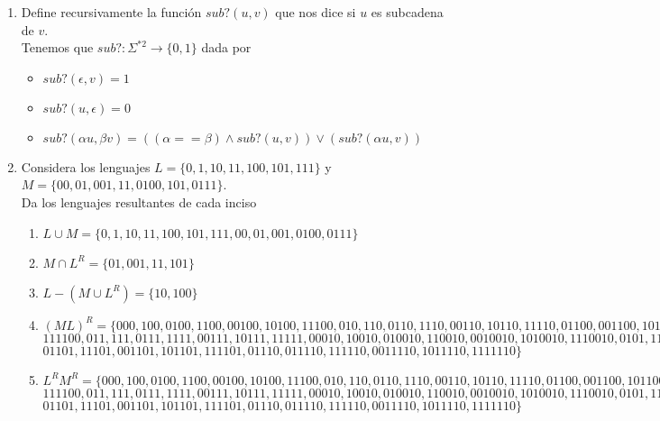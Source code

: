 \documentclass{article}
\begin{document}
\begin{enumerate}
{\begin{enumerate}
            \end{enumerate}
        }
        \item {
            Define recursivamente la función $sub?(u, v)$ que nos dice si $u$ 
            es subcadena de $v$.\\
            Tenemos que $sub?: \Sigma^{*2} \rightarrow \{0, 1\}$ dada por
            \begin{itemize}
                \item {
                    $sub? (\epsilon, v) = 1$
                }
                \item {
                    $sub? (u, \epsilon) = 0$
                }
                \item {
                    $sub?(\alpha u, \beta v) = ((\alpha == \beta) 
                    \wedge sub?(u, v)) \vee (sub?(\alpha u, v))$
                }
            \end{itemize}
        }
        \item {
            Considera los lenguajes $L = \{ 0, 1, 10, 11, 100, 101, 111 \}$ y 
            $M = \{ 00, 01, 001, 11, 0100, 101, 0111 \}$.\\
            Da los lenguajes resultantes de cada inciso
            \begin{enumerate}
                \item {
                    $L \cup M = \{0, 1, 10, 11, 100, 101, 111, 00, 01, 001, 0100, 0111 \}$ 
                }
                \item {
                    $M \cap L^R = \{01, 001, 11, 101 \}$
                }
                \item {
                    $L - (M \cup L^R) = \{10, 100 \}$
                }
                \item {
                    $(ML)^R = \{000, 100, 0100, 1100, 00100, 10100, 11100, 010, 110, 0110, 1110, 00110, 10110, 11110, 01100, 001100, 101100,$\\
                     $111100, 011, 111, 0111, 1111, 00111, 10111, 11111, 00010, 10010, 010010, 110010, 0010010, 1010010, 1110010, 0101, 1101,$\\
                      $01101, 11101, 001101, 101101, 111101, 01110, 011110, 111110, 0011110, 1011110, 1111110 \}$
                }
                \item {
                    $L^RM^R = \{000, 100, 0100, 1100, 00100, 10100, 11100, 010, 110, 0110, 1110, 00110, 10110, 11110, 01100, 001100, 101100,$\\
                     $111100, 011, 111, 0111, 1111, 00111, 10111, 11111, 00010, 10010, 010010, 110010, 0010010, 1010010, 1110010, 0101, 1101,$\\
                      $01101, 11101, 001101, 101101, 111101, 01110, 011110, 111110, 0011110, 1011110, 1111110 \}$
                                                                  
   }
            \end{enumerate}
        }
    \end{enumerate}
\end{document}
